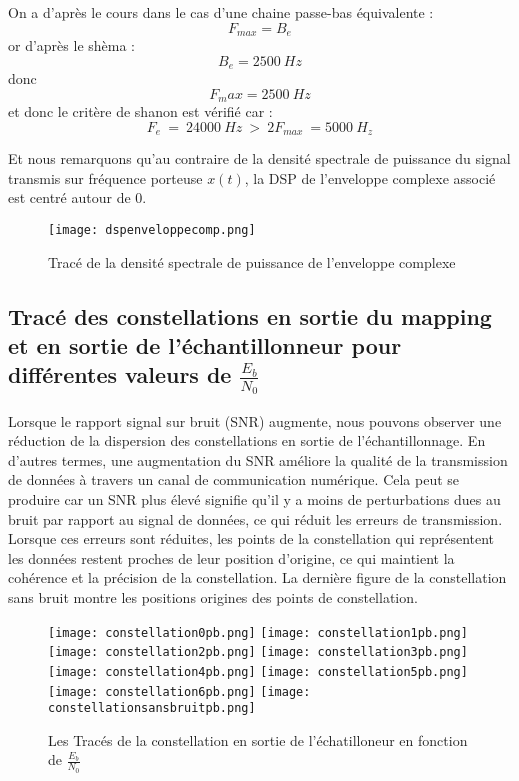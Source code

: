\documentclass[11pt]{article}
\begin{document}
On a d'après le cours dans le cas d'une chaine passe-bas équivalente :
$$F_{max} = B_e$$
or d'après le shèma :
$$B_e = 2500 \ Hz$$
donc 
$$F_max = 2500 \ Hz$$
et donc le critère de shanon est vérifié car :
$$F_e \ = \ 24000 \ Hz \ > \ 2F_{max} \ = 5000 \ H_z $$

Et nous remarquons qu'au contraire de la densité spectrale de puissance du signal transmis sur fréquence porteuse $x(t)$, la DSP de l'enveloppe complexe associé est centré autour de 0.
\begin{figure}[ht!]
    \centering
    \texttt{[image: dspenveloppecomp.png]}
    \caption{Tracé de la densité spectrale de puissance de l'enveloppe complexe  \label{fig : EnveloppeComplexe}}
\end{figure}

\subsection{Tracé des constellations en sortie du mapping et en sortie de l’échantillonneur pour différentes valeurs de $\frac{E_b}{N_0}$}

Lorsque le rapport signal sur bruit (SNR) augmente, nous pouvons observer une réduction de la dispersion des constellations en sortie de l'échantillonnage. En d'autres termes, une augmentation du SNR améliore la qualité de la transmission de données à travers un canal de communication numérique. Cela peut se produire car un SNR plus élevé signifie qu'il y a moins de perturbations dues au bruit par rapport au signal de données, ce qui réduit les erreurs de transmission. Lorsque ces erreurs sont réduites, les points de la constellation qui représentent les données restent proches de leur position d'origine, ce qui maintient la cohérence et la précision de la constellation. La dernière figure de la constellation sans bruit montre les positions origines des points de constellation.
\clearpage
\begin{figure}[ht!]
    \centering
    \texttt{[image: constellation0pb.png]}
    \texttt{[image: constellation1pb.png]}
    \texttt{[image: constellation2pb.png]}
    \texttt{[image: constellation3pb.png]}
    \texttt{[image: constellation4pb.png]}
    \texttt{[image: constellation5pb.png]}
    \texttt{[image: constellation6pb.png]}
    \texttt{[image: constellationsansbruitpb.png]}
    \caption{Les Tracés de la constellation en sortie de l'échatilloneur en fonction de $\frac{E_b}{N_0}$  \label{fig : EnveloppeComplexe}}
\end{figure}
\clearpage
\end{document}
